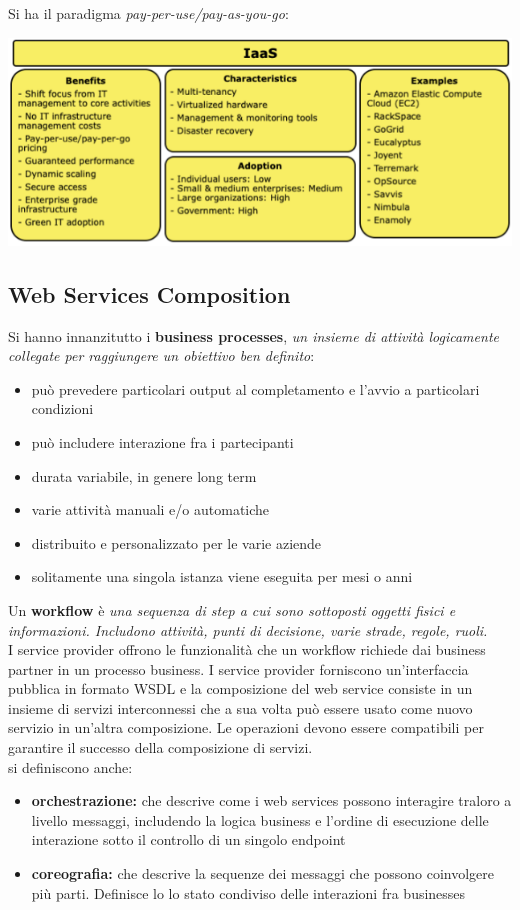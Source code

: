 \documentclass[a4paper,12pt, oneside]{book}
\begin{document}
\begin{enumerate}
  Si ha il paradigma  \textit{pay-per-use/pay-as-you-go}:
  \begin{center}
\includegraphics[scale=0.7]{img/iaas.png}
\end{center}
\end{enumerate}
\subsection{Web Services Composition}
Si hanno innanzitutto i \textbf{business processes}, \textit{un insieme di attività logicamente collegate per raggiungere un obiettivo ben definito}:
\begin{itemize}
\item può prevedere particolari output al completamento e l'avvio a particolari condizioni
\item può includere interazione fra i partecipanti
\item durata variabile, in genere long term
\item varie attività manuali e/o automatiche
\item distribuito e personalizzato per le varie aziende
\item solitamente una singola istanza viene eseguita per mesi o anni
\end{itemize}
Un \textbf{workflow} è \textit{una sequenza di step a cui sono sottoposti oggetti fisici e informazioni. Includono attività, punti di decisione, varie strade, regole, ruoli.}\\
I service provider offrono le funzionalità che un workflow richiede dai business partner in un processo business. 
I service provider forniscono un'interfaccia pubblica in formato WSDL e la composizione del web service consiste
in un insieme di servizi interconnessi che a sua volta può essere usato come nuovo servizio in un'altra composizione.
Le operazioni devono essere compatibili per garantire il successo della composizione di servizi.\\
si definiscono anche:
\begin{itemize}
\item \textbf{orchestrazione:} che descrive come i web services possono interagire traloro a livello messaggi,
  includendo la logica business e l'ordine di esecuzione delle interazione sotto il
  controllo di un singolo endpoint
\item \textbf{coreografia:} che descrive la sequenze dei messaggi che possono coinvolgere più parti. Definisce lo lo stato condiviso delle interazioni fra businesses
\end{itemize}
\end{document}

